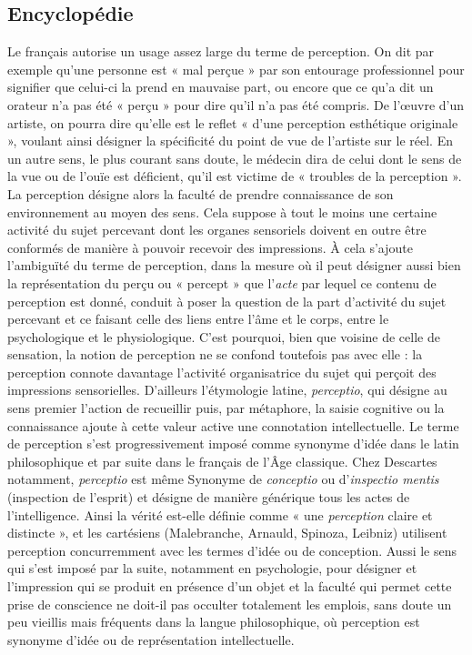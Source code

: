 \subsection{Encyclopédie}
Le français autorise un usage
assez large du terme de perception. On
dit par exemple qu’une personne est
« mal perçue » par son entourage professionnel
pour signifier que celui-ci la prend
en mauvaise part, ou encore que ce qu’a
dit un orateur n’a pas été « perçu » pour
dire qu’il n’a pas été compris. De l’œuvre
d’un artiste, on pourra dire qu’elle est le
reflet « d’une perception esthétique originale »,
voulant ainsi désigner la spécificité
du point de vue de l’artiste sur le réel. En
un autre sens, le plus courant sans doute,
le médecin dira de celui dont le sens de
la vue ou de l’ouïe est déficient, qu’il est
victime de « troubles de la perception ».
La perception désigne alors la faculté de
prendre connaissance de son environnement
au moyen des sens. Cela suppose à
tout le moins une certaine activité du
sujet percevant dont les organes sensoriels
doivent en outre être conformés de
manière à pouvoir recevoir des impressions.
À cela s'ajoute l'ambiguïté du
terme de perception, dans la mesure où il
peut désigner aussi bien la représentation
du perçu ou « percept » que l'{\it acte} par
lequel ce contenu de perception est
donné, conduit à poser la question de la
part d’activité du sujet percevant et ce faisant
celle des liens entre l’âme et le corps,
entre le psychologique et le physiologique.
C’est pourquoi, bien que voisine de
celle de sensation, la notion de perception
ne se confond toutefois pas avec elle : la
perception connote davantage l’activité
organisatrice du sujet qui perçoit des
impressions sensorielles. D’ailleurs l’étymologie
latine, {\it perceptio}, qui désigne au
sens premier l’action de recueillir puis,
par métaphore, la saisie cognitive ou la
connaissance ajoute à cette valeur active
une connotation intellectuelle. Le terme
de perception s’est progressivement
imposé comme synonyme d’idée dans le
latin philosophique et par suite dans le
français de l’Âge classique. Chez Descartes
notamment, {\it perceptio} est même
Synonyme de {\it conceptio} ou d’{\it inspectio
mentis} (inspection de l'esprit) et désigne
de manière générique tous les actes de
l'intelligence. Ainsi la vérité est-elle définie
comme « une {\it perception} claire et distincte »,
et les cartésiens (Malebranche,
Arnauld, Spinoza, Leibniz) utilisent perception
concurremment avec les termes
d'idée ou de conception. Aussi le sens qui
s’est imposé par la suite, notamment en
%
psychologie, pour désigner et l'impression
qui se produit en présence d’un objet et
la faculté qui permet cette prise de
conscience ne doit-il pas occulter totalement
les emplois, sans doute un peu vieillis
mais fréquents dans la langue
philosophique, où perception est synonyme
d’idée ou de représentation intellectuelle.

